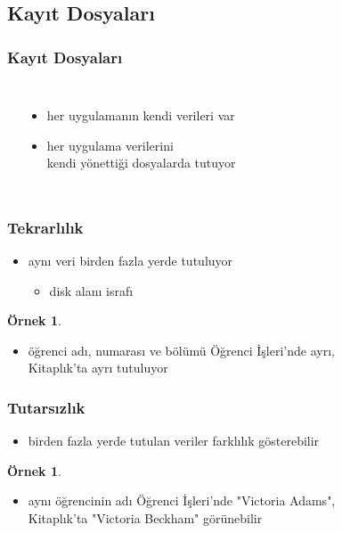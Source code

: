 \documentclass[dvipsnames]{beamer}
\theoremstyle{definition}
\theoremstyle{example}
\newtheorem{ornek}[theorem]{Örnek}
\theoremstyle{plain}
\begin{document}
\subsection{Kayıt Dosyaları}

\begin{frame}
  \frametitle{Kayıt Dosyaları}

  \begin{columns}[b]
    \begin{center}
    \end{center}

    \begin{itemize}
      \item her uygulamanın kendi verileri var
      \item her uygulama verilerini\\
	kendi yönettiği dosyalarda tutuyor
    \end{itemize}
  \end{columns}
\end{frame}

\begin{frame}
  \frametitle{Tekrarlılık}

  \begin{itemize}
    \item aynı veri birden fazla yerde tutuluyor
    \begin{itemize}
      \item disk alanı israfı
    \end{itemize}
  \end{itemize}

  \pause
  \begin{ornek}
    \begin{itemize}
      \item öğrenci adı, numarası ve bölümü Öğrenci İşleri'nde ayrı,\\
	Kitaplık'ta ayrı tutuluyor
    \end{itemize}
  \end{ornek}
\end{frame}

\begin{frame}
  \frametitle{Tutarsızlık}

  \begin{itemize}
    \item birden fazla yerde tutulan veriler farklılık gösterebilir
  \end{itemize}

  \pause
  \begin{ornek}
    \begin{itemize}
      \item aynı öğrencinin adı Öğrenci İşleri'nde "Victoria Adams",\\
        Kitaplık'ta "Victoria Beckham" görünebilir
    \end{itemize}
  \end{ornek}
\end{frame}
\end{document}
